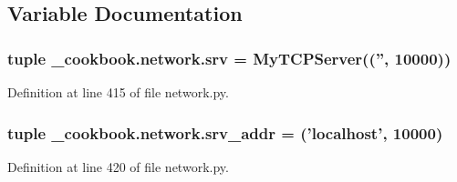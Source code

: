 \subsection{Variable Documentation}
\hypertarget{namespace__cookbook_1_1network_af47f70f9a1bf283ae86e02e67cf9c91a}{
\subsubsection[{srv}]{\setlength{\rightskip}{0pt plus 5cm}tuple \-\_\-cookbook.\-network.\-srv = {\bf My\-T\-C\-P\-Server}(('', 10000))}}\label{namespace__cookbook_1_1network_af47f70f9a1bf283ae86e02e67cf9c91a}


Definition at line 415 of file network.\-py.

\hypertarget{namespace__cookbook_1_1network_a07395291bd1e407e4fdf8850535b5427}{
\subsubsection[{srv\-\_\-addr}]{\setlength{\rightskip}{0pt plus 5cm}tuple \-\_\-cookbook.\-network.\-srv\-\_\-addr = ('localhost', 10000)}}\label{namespace__cookbook_1_1network_a07395291bd1e407e4fdf8850535b5427}


Definition at line 420 of file network.\-py.

